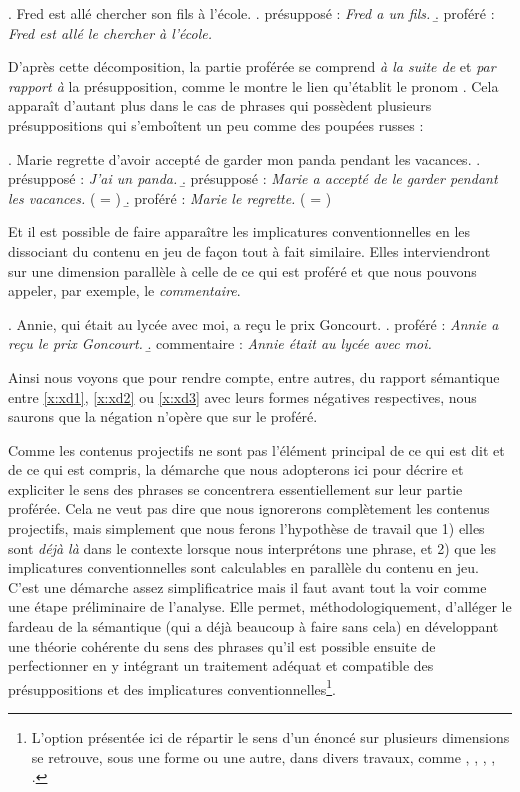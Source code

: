 \begin{refsegment}
\ex. Fred est allé chercher son fils à l'école.\label{x:xd1}
\a. présupposé : \emph{Fred a un fils.}
\b. proféré : \emph{Fred est allé le chercher à l'école.}

D'après cette  décomposition, la partie proférée se comprend \emph{à la suite de} et \emph{par rapport à} la présupposition, comme le montre le lien qu'établit le pronom .   Cela apparaît d'autant plus dans le cas de phrases qui possèdent plusieurs présuppositions qui s'emboîtent un peu comme des poupées russes :

\ex.
Marie regrette d'avoir accepté de garder mon panda pendant les
vacances.\label{x:xd2}
\a. présupposé : \emph{J'ai un panda.}
\b. présupposé : \emph{Marie a accepté de le garder pendant les vacances.} ( = )
\b. proféré : \emph{Marie le regrette.} ( = )


Et il est possible de faire apparaître les implicatures conventionnelles en les dissociant du contenu en jeu de façon tout à fait similaire.  Elles interviendront sur une dimension parallèle à celle de ce qui est proféré et que nous pouvons appeler, par exemple, le \emph{commentaire}. 

\ex.
Annie, qui était au lycée avec moi, a reçu le prix Goncourt.\label{x:xd3}
\a. proféré : \emph{Annie a reçu le prix Goncourt.}
\b. commentaire : \emph{Annie était au lycée avec moi.}


Ainsi nous voyons que pour rendre compte, entre autres, du rapport sémantique entre \ref{x:xd1}, \ref{x:xd2} ou \ref{x:xd3} avec leurs formes négatives respectives, nous saurons que la négation n'opère que sur le proféré.

Comme les contenus projectifs ne sont pas l'élément principal de ce qui est dit et de ce qui est compris, la démarche que nous adopterons ici pour décrire et expliciter le sens des phrases se concentrera essentiellement sur leur partie proférée.  Cela ne veut pas dire que nous ignorerons complètement les contenus projectifs, mais simplement que nous ferons l'hypothèse de travail que 1) elles sont \emph{déjà là} dans le contexte lorsque nous interprétons une phrase, et 2) que les implicatures conventionnelles sont calculables en parallèle du contenu en jeu.   
C'est une démarche assez simplificatrice mais il faut avant tout la voir comme une étape préliminaire de l'analyse. Elle permet, méthodologiquement, d'alléger le fardeau de la sémantique (qui a déjà beaucoup à faire sans cela) en développant une théorie cohérente du sens des phrases qu'il est possible ensuite de perfectionner en y intégrant un traitement adéquat et compatible des présuppositions et des implicatures conventionnelles\footnote{L'option présentée ici de répartir le sens d'un énoncé sur plusieurs dimensions se retrouve, sous une forme ou une autre, dans divers travaux, comme \citet{KartPet:79}, \citet{vdS:92}, \citet{Roberts:96}, \citet{KampPrsp:01}, \citet{Potts:05}.}. 


\end{refsegment}
